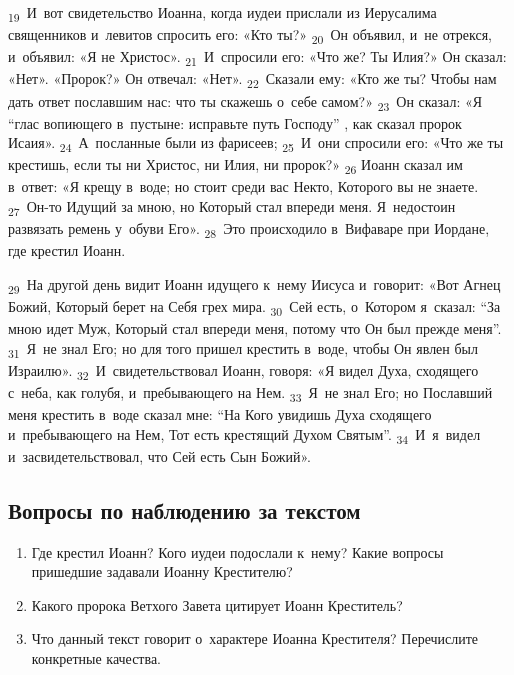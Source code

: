 \documentclass[a4paper,12pt]{article}
\begin{document}
 \textsubscript{19}~И~вот свидетельство Иоанна, когда иудеи прислали из Иерусалима священников и~левитов спросить его: «Кто ты?» \textsubscript{20}~Он объявил, и~не отрекся, и~объявил: «Я не Христос». \textsubscript{21}~И~спросили его: «Что же? Ты Илия?» Он сказал: «Нет». «Пророк?» Он отвечал: «Нет». \textsubscript{22}~Сказали ему: «Кто же ты? Чтобы нам дать ответ пославшим нас: что ты скажешь о~себе самом?» \textsubscript{23}~Он сказал: «Я “глас вопиющего в~пустыне: исправьте путь Господу” , как сказал пророк Исаия». \textsubscript{24}~А~посланные были из фарисеев; \textsubscript{25}~И~они спросили его: «Что же ты крестишь, если ты ни Христос, ни Илия, ни пророк?» \textsubscript{26} Иоанн сказал им в~ответ: «Я крещу в~воде; но стоит среди вас Некто, Которого вы не знаете. \textsubscript{27}~Он-то Идущий за мною, но Который стал впереди меня. Я~недостоин развязать ремень у~обуви Его». \textsubscript{28}~Это происходило в~Вифаваре при Иордане, где крестил Иоанн. 
 
 \textsubscript{29}~На другой день видит Иоанн идущего к~нему Иисуса и~говорит: «Вот Агнец Божий, Который берет на Себя грех мира. \textsubscript{30}~Сей есть, о~Котором я~сказал: “За мною идет Муж, Который стал впереди меня, потому что Он был прежде меня”. \textsubscript{31}~Я~не знал Его; но для того пришел крестить в~воде, чтобы Он явлен был Израилю». \textsubscript{32}~И~свидетельствовал Иоанн, говоря: «Я видел Духа, сходящего с~неба, как голубя, и~пребывающего на Нем. \textsubscript{33}~Я~не знал Его; но Пославший меня крестить в~воде сказал мне: “На Кого увидишь Духа сходящего и~пребывающего на Нем, Тот есть крестящий Духом Святым”. \textsubscript{34}~И~я~видел и~засвидетельствовал, что Сей есть Сын Божий».

\subsection*{Вопросы по наблюдению за текстом}
\begin{enumerate}
    \item Где крестил Иоанн? Кого иудеи подослали к~нему? Какие вопросы пришедшие задавали Иоанну Крестителю? 
    
    \myline
    
    \myline
    \item Какого пророка Ветхого Завета цитирует Иоанн Креститель? 
    
    \myline
    
    \myline
    \item Что данный текст говорит о~характере Иоанна Крестителя? Перечислите конкретные качества.
    
    \myline
    
    \myline
\end{enumerate}
\end{document}
